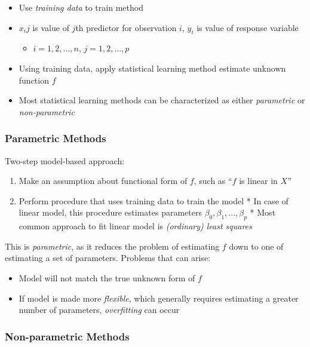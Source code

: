 \documentclass[]{book}
\providecommand{\tightlist}{%
  \setlength{\itemsep}{0pt}\setlength{\parskip}{0pt}}
\begin{document}
\begin{itemize}
\tightlist
\item
  Use \emph{training data} to train method
\item
  \(x_ij\) is value of \(j\)th predictor for observation \(i\), \(y_i\) is value of response variable

  \begin{itemize}
  \tightlist
  \item
    \(i = 1, 2, ..., n\), \(j = 1, 2, ..., p\)
  \end{itemize}
\item
  Using training data, apply statistical learning method estimate unknown function \(f\)
\item
  Most statistical learning methods can be characterized as either \emph{parametric} or \emph{non-parametric}
\end{itemize}

\hypertarget{parametric-methods}{%
\subsubsection{Parametric Methods}\label{parametric-methods}}

Two-step model-based approach:

\begin{enumerate}
\def\labelenumi{\arabic{enumi}.}
\tightlist
\item
  Make an assumption about functional form of \(f\), such as ``\(f\) is linear in \(X\)''
\item
  Perform procedure that uses training data to train the model
  * In case of linear model, this procedure estimates parameters \(β_0, β_1, ..., β_p\)
  * Most common approach to fit linear model is \emph{(ordinary) least squares}
\end{enumerate}

This is \emph{parametric}, as it reduces the problem of estimating \(f\) down to one of estimating a set of parameters. Problems that can arise:

\begin{itemize}
\tightlist
\item
  Model will not match the true unknown form of \(f\)
\item
  If model is made more \emph{flexible}, which generally requires estimating a greater number of parameters, \emph{overfitting} can occur
\end{itemize}

\hypertarget{non-parametric-methods}{%
\subsubsection{Non-parametric Methods}\label{non-parametric-methods}}
\end{document}
